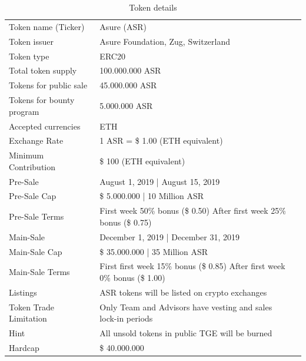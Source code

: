 \begin{table}[H]
\begin{tabular}{lp{}l}
  Token name (Ticker) & Asure (ASR) \\  
  Token issuer & Asure Foundation, Zug, Switzerland\\
  Token type & ERC20\\
  Total token supply & 100.000.000 ASR \\
  Tokens for public sale & 45.000.000 ASR \\
  Tokens for bounty program & 5.000.000 ASR \\
  Accepted currencies & ETH \\
  Exchange Rate & 1 ASR = \$ 1.00 (ETH equivalent) \\
  Minimum Contribution & \$ 100 (ETH equivalent) \\\hline  
 
  Pre-Sale & August 1, 2019 | August 15, 2019 \\
  Pre-Sale Cap & \$ 5.000.000 | 10 Million ASR\\
  Pre-Sale Terms & First week 50\% bonus (\$ 0.50) \newline
                   After first week 25\% bonus (\$ 0.75)\\\hline
  
  Main-Sale & December 1, 2019 | December 31, 2019 \\
  Main-Sale Cap & \$ 35.000.000 | 35 Million ASR\\
  Main-Sale Terms & First first week 15\% bonus (\$ 0.85)\newline
                    After first week 0\% bonus (\$ 1.00)\\\hline


  Listings & ASR tokens will be listed on crypto exchanges \\
  Token Trade Limitation & Only Team and Advisors have vesting and sales lock-in periods \\
  Hint & All unsold tokens in public TGE  will be burned \\\hline     

  
  Hardcap & \$ 40.000.000
  
\end{tabular}
\caption{\label{tab:table-name}Token details}
\end{table}

